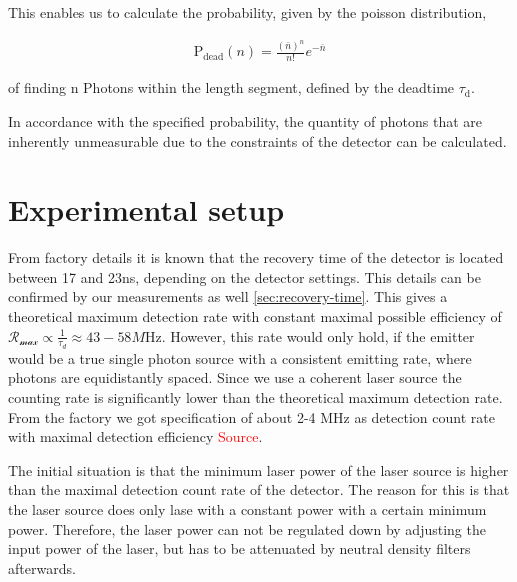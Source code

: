 This enables us to calculate the probability, given by the poisson distribution,

\begin{align}
    \text{P}_{\text{dead}}(n) = \frac{(\bar{n})^n}{n!} e^{-\bar{n}}
\end{align}

of finding n Photons within the length segment, defined by the deadtime $\tau_{\text{d}}$.

In accordance with the specified probability, the quantity of photons that are inherently unmeasurable due to the
constraints of the detector can be calculated.


\section{Experimental setup}

From factory details it is known that the recovery time of the detector is located between 17 and 23ns, depending on the
detector settings.
This details can be confirmed by our measurements as well \ref{sec:recovery-time}.
This gives a theoretical maximum detection rate with constant maximal possible efficiency of $\mathcal{R_{\max}} \propto \frac{1}{\tau_{d}} \approx 43-58\si{M\Hz}$.
However, this rate would only hold, if the emitter would be a true single photon source with a consistent emitting rate, where
photons are equidistantly spaced.
Since we use a coherent laser source the counting rate is significantly lower than the theoretical maximum detection rate.
From the factory we got specification of about 2-4 MHz as detection count rate with maximal detection efficiency \textcolor{red}{Source}.


The initial situation is that the minimum laser power of the laser source is higher than the maximal detection count rate of the detector.
The reason for this is that the laser source does only lase with a constant power with a certain minimum power.
Therefore, the laser power can not be regulated down by adjusting the input power of the laser, but has to be attenuated
by neutral density filters afterwards.

